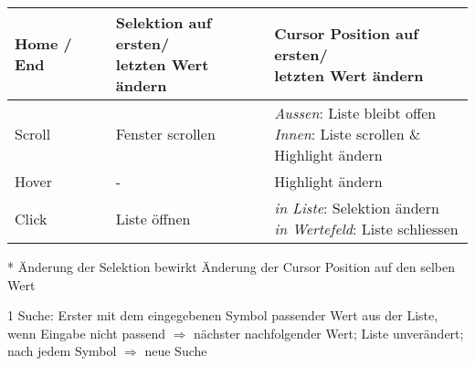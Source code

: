 \begin{table}[!htb]
\begin{adjustbox}{max width=0.95\textwidth}
\begin{threeparttable}
\begin{tabular}{ l || l | l }
                \hline
                Home / End & \tbbr{Selektion auf ersten/ \\ 
                                   letzten Wert ändern}   & \tbbr{Cursor Position auf ersten/ \\ 
                                                                  letzten Wert ändern}                   \\
                \hline \hline
                Scroll     & Fenster scrollen             & \tbbr{\emph{Aussen}: Liste bleibt offen \\
                                                                  \emph{Innen}: Liste scrollen \& \\ 
                                                                                Highlight ändern}        \\
                \hline
                Hover      & -                            & Highlight ändern                             \\
                \hline
                Click      & Liste öffnen                 & \tbbr{\emph{in Liste}: Selektion ändern \\
                                                                  \emph{in Wertefeld}: Liste schliessen} \\
                \hline
            \end{tabular}
            \begin{tablenotes}
                \scriptsize
                \item[*] Änderung der Selektion bewirkt Änderung der Cursor Position auf den selben Wert
                \item
                \item[1] Suche: Erster mit dem eingegebenen Symbol passender Wert aus der Liste, wenn Eingabe nicht passend $\Rightarrow$ nächster nachfolgender Wert; 
                                Liste unverändert; nach jedem Symbol $\Rightarrow$ neue Suche
            \end{tablenotes}
        \end{threeparttable}
    \end{adjustbox}
\end{table}
